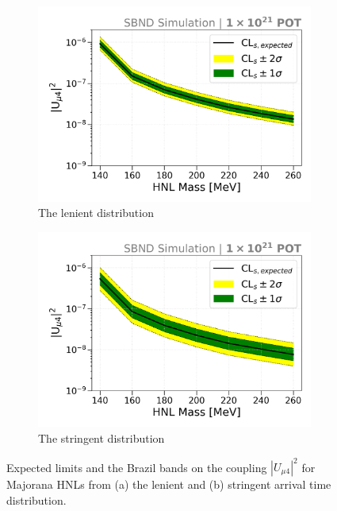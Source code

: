 \begin{figure}[hb!]
        \begin{subfigure}[b]{0.495\textwidth}
            \includegraphics[width=\textwidth]{sensitivity_loose}
            \caption{The lenient distribution}%
        \end{subfigure}
        \begin{subfigure}[b]{0.495\textwidth}
            \includegraphics[width=\textwidth]{sensitivity_strict}
            \caption{The stringent distribution}%
        \end{subfigure}
    \caption[Expected Limits on the Coupling $|U_{\mu4}|^2$ for Majorana HNLs]{
    Expected limits and the Brazil bands on the coupling $|U_{\mu4}|^2$ for Majorana HNLs from (a) the lenient and (b) stringent arrival time distribution.
    }
    \label{fig:nupi0_reco_result}
\end{figure}

